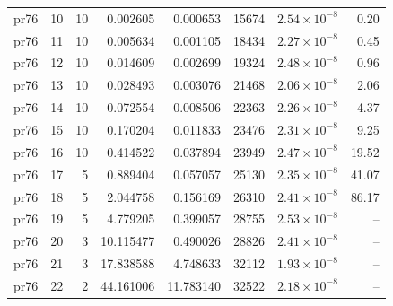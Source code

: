 \begin{table}[htbp]
\begin{tabular}{lrrrrrrr}
pr76 & 10 & 10 & 0.002605 & 0.000653 & 15674 & $2.54\times 10^{-8}$ & 0.20 \\
pr76 & 11 & 10 & 0.005634 & 0.001105 & 18434 & $2.27\times 10^{-8}$ & 0.45 \\
pr76 & 12 & 10 & 0.014609 & 0.002699 & 19324 & $2.48\times 10^{-8}$ & 0.96 \\
pr76 & 13 & 10 & 0.028493 & 0.003076 & 21468 & $2.06\times 10^{-8}$ & 2.06 \\
pr76 & 14 & 10 & 0.072554 & 0.008506 & 22363 & $2.26\times 10^{-8}$ & 4.37 \\
pr76 & 15 & 10 & 0.170204 & 0.011833 & 23476 & $2.31\times 10^{-8}$ & 9.25 \\
pr76 & 16 & 10 & 0.414522 & 0.037894 & 23949 & $2.47\times 10^{-8}$ & 19.52 \\
pr76 & 17 & 5 & 0.889404 & 0.057057 & 25130 & $2.35\times 10^{-8}$ & 41.07 \\
pr76 & 18 & 5 & 2.044758 & 0.156169 & 26310 & $2.41\times 10^{-8}$ & 86.17 \\
pr76 & 19 & 5 & 4.779205 & 0.399057 & 28755 & $2.53\times 10^{-8}$ & -- \\
pr76 & 20 & 3 & 10.115477 & 0.490026 & 28826 & $2.41\times 10^{-8}$ & -- \\
pr76 & 21 & 3 & 17.838588 & 4.748633 & 32112 & $1.93\times 10^{-8}$ & -- \\
pr76 & 22 & 2 & 44.161006 & 11.783140 & 32522 & $2.18\times 10^{-8}$ & -- \\
\bottomrule
\end{tabular}
\end{table}
